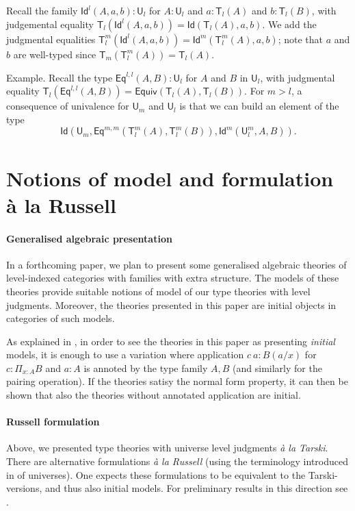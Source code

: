 \documentclass[a4paper,UKenglish,cleveref, autoref, thm-restate]{lipics-v2021}
\newcommand{\Id}{\mathsf{Id}}
\newcommand{\Eq}{\mathsf{Eq}}
\newcommand{\UU}{\mathsf{U}}
\newcommand{\mypi}[3]{\Pi_{#1:#2}#3}
\newcommand{\T}{\mathsf{T}}
\newcommand{\Equiv}{\mathsf{Equiv}}
\begin{document}
Recall the family $\Id^l(A,a,b):\UU_l$ for $A:\UU_l$
and $a:\T_l(A)$ and $b:\T_l(B)$, with
judgemental equality $\T_l(\Id^l(A,a,b)) = \Id(\T_l(A),a,b)$.
We add the judgmental equalities $\T_l^m(\Id^l(A,a,b)) =
\Id^m(\T_l^m(A),a,b)$; note that $a$ and $b$ are well-typed since
$\T_{m}(\T_{l}^{m}(A)) = \T_{l}(A)$.

\medskip

Example. Recall the type $\Eq^{l,l}(A,B):\UU_l$ for $A$ and $B$ in $\UU_l$,
with judgmental equality
$\T_l(\Eq^{l,l}(A,B)) = \Equiv(\T_l(A),\T_l(B))$.
For $m>l$, a consequence of univalence
for $\UU_m$ and $\UU_l$ is that we can build an element of the type
$$
\Id(\UU_m,\Eq^{m,m}(\T^m_l(A),\T^m_l(B)),\Id^m(\UU^m_l,A,B)).
$$

\section{Notions of model and formulation \`a la Russell} \label{appendix:2}

\paragraph*{Generalised algebraic presentation}

In a forthcoming paper, we plan to present some generalised algebraic theories of level-indexed categories with families with extra structure.  The models of these theories provide suitable notions of model of our type theories with level judgments. Moreover, the theories presented in this paper are initial objects in categories of such models.
\begin{remark} \label{app:annotation}
As explained
in \cite{streicher:semtt}, in order to see the theories in this paper as presenting {\em initial} models,
it is enough to use a variation where application $c~a:B(a/x)$ for $c:\mypi{x}{A}B$ and $a:A$
is annoted by the type family $A,B$ (and similarly for the pairing operation). If the theories satisy the normal form property, it can then be shown that also the theories without annotated application are initial.
\end{remark}


\paragraph*{Russell formulation}
Above, we presented type theories with universe level judgments {\em \`a la Tarski}. There are alternative formulations
{\em \`a la Russell} (using the terminology introduced in
\cite{martinlof:padova} of
universes). One expects these formulations to be equivalent to the Tarski-versions, and thus also initial models. For preliminary results in this
direction see \cite{Assaf14,Thire20}.
\end{document}
